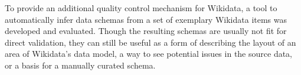 
\Abstract
To provide an additional quality control mechanism for Wikidata,
a tool to automatically infer data schemas from a set of exemplary Wikidata items
was developed and evaluated.
Though the resulting schemas are usually not fit for direct validation,
they can still be useful as a form of describing the layout of an area of Wikidata’s data model,
a way to see potential issues in the source data, %
or a basis for a manually curated schema.
